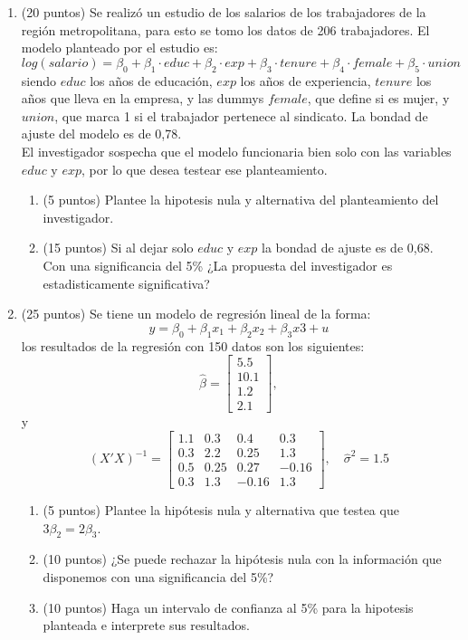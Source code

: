 \documentclass[10pt,a4paper]{article}
\begin{document}
\begin{enumerate}
\item (20 puntos) Se realizó un estudio de los salarios de los trabajadores de la región metropolitana, para esto se tomo los datos de 206 trabajadores. El modelo planteado por el estudio es:
$$log(salario) = \beta_0 + \beta_1 \cdot educ + \beta_2\cdot exp + \beta_3 \cdot tenure + \beta_4 \cdot female + \beta_5 \cdot union$$ 
siendo $educ$ los años de educación, $exp$ los años de experiencia, $tenure$ los años que lleva en la empresa, y las dummys $female$, que define si es mujer, y $union$, que marca 1 si el trabajador pertenece al sindicato. La bondad de ajuste del modelo es de 0,78. \\
El investigador sospecha que el modelo funcionaria bien solo con las variables $educ$ y $exp$, por lo que desea testear ese planteamiento. 
\begin{enumerate}
    \item (5 puntos) Plantee la hipotesis nula y alternativa del planteamiento del investigador.
    \item (15 puntos) Si al dejar solo $educ$ y $exp$ la bondad de ajuste es de 0,68. Con una significancia del 5\% ¿La propuesta del investigador es estadisticamente significativa?
\end{enumerate}

\item (25 puntos) Se tiene un modelo de regresión lineal de la forma:
$$y=\beta_0 + \beta_1 x_1+\beta_2x_2+\beta_3 x3 + u$$
los resultados de la regresión con 150 datos son los siguientes:
        \[
          \hat{\beta} = \begin{bmatrix} 5.5 \\ 10.1 \\ 1.2 \\ 2.1 \end{bmatrix},
        \]
y 
        \[
          (X'X)^{-1} =
          \begin{bmatrix}
1.1 & 0.3  & 0.4  &  0.3\\
0.3 & 2.2  & 0.25  & 1.3\\
0.5 & 0.25  & 0.27  & -0.16\\
0.3 & 1.3 & -0.16 &  1.3
\end{bmatrix},
          \quad \hat{\sigma}^2 = 1.5
        \]
\begin{enumerate}
    \item (5 puntos) Plantee la hipótesis nula y alternativa que testea que $3\beta_2=2\beta_3$.

    \item (10 puntos) ¿Se puede rechazar la hipótesis nula con la información que disponemos con una significancia del 5\%?

    \item (10 puntos) Haga un intervalo de confianza al 5\% para la hipotesis planteada e interprete sus resultados.

\end{enumerate}


\end{enumerate}
\end{document}
